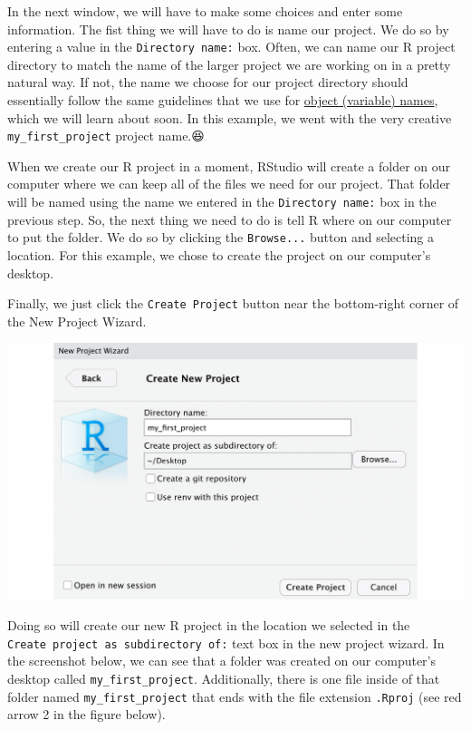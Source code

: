 \documentclass[
  letterpaper,
  DIV=11,
  numbers=noendperiod]{scrreprt}
\begin{document}
In the next window, we will have to make some choices and enter some
information. The fist thing we will have to do is name our project. We
do so by entering a value in the \texttt{Directory\ name:} box. Often,
we can name our R project directory to match the name of the larger
project we are working on in a pretty natural way. If not, the name we
choose for our project directory should essentially follow the same
guidelines that we use for \hyperref[object-variable-names]{object
(variable) names}, which we will learn about soon. In this example, we
went with the very creative \texttt{my\_first\_project} project name.😆

When we create our R project in a moment, RStudio will create a folder
on our computer where we can keep all of the files we need for our
project. That folder will be named using the name we entered in the
\texttt{Directory\ name:} box in the previous step. So, the next thing
we need to do is tell R where on our computer to put the folder. We do
so by clicking the \texttt{Browse...} button and selecting a location.
For this example, we chose to create the project on our computer's
desktop.

Finally, we just click the \texttt{Create\ Project} button near the
bottom-right corner of the New Project Wizard.

\includegraphics{chapters/r_projects/create_05_directory.png}

Doing so will create our new R project in the location we selected in
the \texttt{Create\ project\ as\ subdirectory\ of:} text box in the new
project wizard. In the screenshot below, we can see that a folder was
created on our computer's desktop called \texttt{my\_first\_project}.
Additionally, there is one file inside of that folder named
\texttt{my\_first\_project} that ends with the file extension
\texttt{.Rproj} (see red arrow 2 in the figure below).
\end{document}
